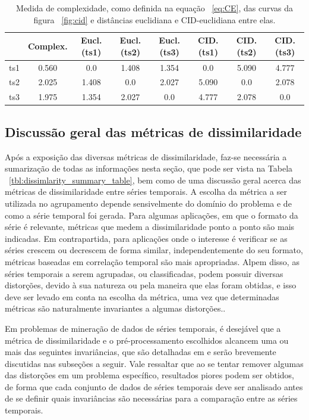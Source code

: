 \begin{table}[]
	\centering
	\caption{Medida de complexidade, como definida na equação ~\ref{eq:CE}, das curvas da figura ~\ref{fig:cid} e distâncias euclidiana e CID-euclidiana entre elas.}
	\label{cid_table}
	\begin{tabular}{c|c|ccc|ccc}
		\toprule
		& Complex.  & Eucl.(ts1)   & Eucl.(ts2)   &Eucl.(ts3)  & CID.(ts1)   & CID.(ts2)   &CID.(ts3) \\
		\midrule

ts1 & 0.560 & 0.0 & 1.408 & 1.354 & 0.0 & 5.090 & 4.777\\
ts2 & 2.025 & 1.408 & 0.0 & 2.027 & 5.090 & 0.0  & 2.078\\		
ts3 & 1.975 & 1.354 & 2.027 & 0.0 & 4.777 & 2.078  & 0.0\\
		\bottomrule
	\end{tabular}
\end{table}

\subsection{Discussão geral das métricas de dissimilaridade}

Após a exposição das diversas métricas de dissimilaridade, faz-se necessária a sumarização de todas as informações nesta seção, que pode ser vista na Tabela ~\ref{tbl:dissimlarity_summary_table}, bem como de uma discussão geral acerca das métricas de dissimilaridade entre séries temporais. A escolha da métrica a ser utilizada no agrupamento depende sensivelmente do domínio do problema e de como a série temporal foi gerada. Para algumas aplicações, em que o formato da série é relevante, métricas que medem a dissimilaridade ponto a ponto são mais indicadas. Em contrapartida, para aplicações onde o interesse é verificar se as séries crescem ou decrescem de forma similar, independentemente do seu formato, métricas baseadas em correlação temporal são mais apropriadas. Alpem disso, as séries temporais a serem agrupadas, ou classificadas, podem possuir diversas distorções, devido à sua natureza ou pela maneira que elas foram obtidas, e isso deve ser levado em conta na escolha da métrica, uma vez que determinadas métricas são naturalmente invariantes a algumas distorções.. 

Em problemas de mineração de dados de séries temporais, é desejável que a métrica de dissimilaridade e o pré-processamento escolhidos alcancem uma ou mais das seguintes invariâncias, que são detalhadas em \parencite{CID} e serão brevemente discutidas nas subseções a seguir. Vale ressaltar que ao se tentar remover algumas das distorções em um problema específico, resultados piores podem ser obtidos, de forma que cada conjunto de dados de séries temporais deve ser analisado antes de se definir quais invariâncias são necessárias para a comparação entre as séries temporais.

